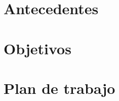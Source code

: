 \documentclass[../main.tex]{subfiles}
\begin{document}
\section{Antecedentes}

\section{Objetivos}

\section{Plan de trabajo}
\end{document}
